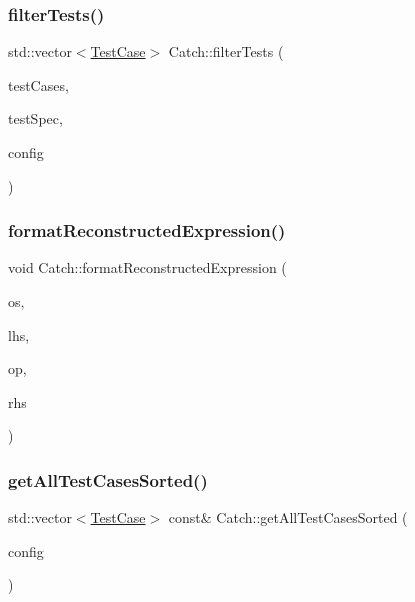 \subsubsection{\texorpdfstring{filterTests()}{filterTests()}}
{\footnotesize\ttfamily std\+::vector$<$\mbox{\hyperlink{class_catch_1_1_test_case}{Test\+Case}}$>$ Catch\+::filter\+Tests (\begin{DoxyParamCaption}\item[{std\+::vector$<$ \mbox{\hyperlink{class_catch_1_1_test_case}{Test\+Case}} $>$ const \&}]{test\+Cases,  }\item[{Test\+Spec const \&}]{test\+Spec,  }\item[{\mbox{\hyperlink{struct_catch_1_1_i_config}{I\+Config}} const \&}]{config }\end{DoxyParamCaption})}

\mbox{\label{namespace_catch_a520110c31f26cf9892595772ab814fc0}} 
\subsubsection{\texorpdfstring{formatReconstructedExpression()}{formatReconstructedExpression()}}
{\footnotesize\ttfamily void Catch\+::format\+Reconstructed\+Expression (\begin{DoxyParamCaption}\item[{std\+::ostream \&}]{os,  }\item[{std\+::string const \&}]{lhs,  }\item[{\mbox{\hyperlink{class_catch_1_1_string_ref}{String\+Ref}}}]{op,  }\item[{std\+::string const \&}]{rhs }\end{DoxyParamCaption})}

\mbox{\label{namespace_catch_a1c9b1a23bc947ea70ddaabf067276cf2}} 
\subsubsection{\texorpdfstring{getAllTestCasesSorted()}{getAllTestCasesSorted()}}
{\footnotesize\ttfamily std\+::vector$<$\mbox{\hyperlink{class_catch_1_1_test_case}{Test\+Case}}$>$ const\& Catch\+::get\+All\+Test\+Cases\+Sorted (\begin{DoxyParamCaption}\item[{\mbox{\hyperlink{struct_catch_1_1_i_config}{I\+Config}} const \&}]{config }\end{DoxyParamCaption})}

